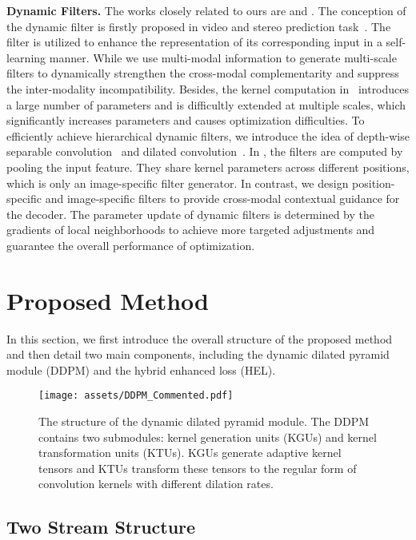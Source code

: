 \documentclass[runningheads]{llncs}
\begin{document}
\noindent\textbf{Dynamic Filters.}
The works closely related to ours are \cite{DFN} and \cite{DCM}.
The conception of the dynamic filter is firstly proposed in video and stereo prediction task~\cite{DFN}. The filter is utilized to enhance the representation of its corresponding input in a self-learning manner.
While we use multi-modal information to generate multi-scale filters to dynamically strengthen the cross-modal complementarity and suppress the inter-modality incompatibility.
Besides, the kernel computation in~\cite{DFN} introduces a large number of parameters and is difficultly extended at multiple scales, which significantly increases parameters and causes optimization difficulties.
To efficiently achieve hierarchical dynamic filters, we introduce the idea of depth-wise separable convolution~\cite{MobileNet} and dilated convolution~\cite{DilatedConvolution}.
In \cite{DCM}, the filters are computed by pooling the input feature. They share kernel parameters across different positions, which is only an image-specific filter generator.
In contrast, we design position-specific and image-specific filters to provide cross-modal contextual guidance for the decoder. The parameter update of dynamic filters is determined by the gradients of local neighborhoods to achieve more targeted adjustments and guarantee the overall performance of optimization.

\section{Proposed Method}\label{sec:network}

In this section, we first introduce the overall structure of the proposed method and then detail two main components, including the dynamic dilated pyramid module (DDPM) and the hybrid enhanced loss (HEL).

\begin{figure}[t]
 \centering
 \texttt{[image: assets/DDPM\_Commented.pdf]}
 \caption{The structure of the dynamic dilated pyramid module. The DDPM contains two submodules: kernel generation units (KGUs) and kernel transformation units (KTUs). KGUs generate adaptive kernel tensors and KTUs transform these tensors to the regular form of convolution kernels with different dilation rates.}
 \label{fig:DDPM}
\end{figure}

\subsection{Two Stream Structure}
\end{document}
